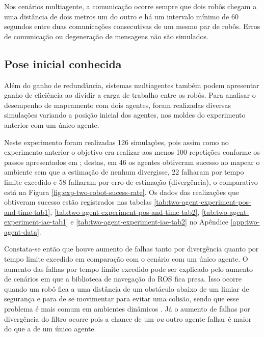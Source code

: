 Nos cenários multiagente, a comunicação ocorre sempre que dois robôs 
chegam a uma distância de dois metros um do outro e há um intervalo 
mínimo de 60 segundos entre duas comunicações consecutivas de um mesmo 
par de robôs. Erros de comunicação ou degeneração de mensagens não são 
simulados.

\subsection{Pose inicial conhecida}
\label{sec:exp-known-initial-pose}
Além do ganho de redundância, sistemas multiagentes também podem 
apresentar ganho de eficiência ao dividir a carga de trabalho entre os 
robôs. Para analisar o desempenho de mapeamento com dois agentes, 
foram realizadas diversas simulações variando a posição inicial dos 
agentes, nos moldes do experimento anterior com um único agente.

Neste experimento foram realizadas 126 simulações, pois assim como no experimento anterior o objetivo era realizar aos menos 100 repetições conforme os passos apresentados em \cite[p.~52]{paula2014metodo}; destas, em 46 os 
agentes obtiveram sucesso ao mapear o ambiente sem que a estimação de 
nenhum divergisse, 22 falharam por tempo limite excedido e 58 
falharam por erro de estimação (divergência), o comparativo está na 
Figura \ref{fig:exp-two-robot-sucess-rate}. Os dados das realizações 
que obtiveram sucesso estão registrados nas tabelas \ref{tab:two-agent-experiment-pos-and-time-tab1}, \ref{tab:two-agent-experiment-pos-and-time-tab2}, \ref{tab:two-agent-experiment-iae-tab1} e \ref{tab:two-agent-experiment-iae-tab2} no Apêndice \ref{app:two-agent-data}.

Constata-se então que houve aumento de falhas 
tanto por divergência quanto por tempo limite excedido em comparação 
com o cenário com um único agente. O aumento das falhas por tempo limite 
excedido pode ser explicado pelo aumento de cenários em que a biblioteca de navegação do 
ROS fica presa. Isso ocorre quando um robô fica a uma distância de um obstáculo abaixo de um limiar de segurança e para de se movimentar para evitar uma colisão, sendo que esse problema é mais comum em ambientes dinâmicos \cite{zheng2021ros}. Já o aumento de falhas por divergência do filtro ocorre 
pois a chance de um \emph{ou} outro agente falhar é maior do que a de um único agente.

